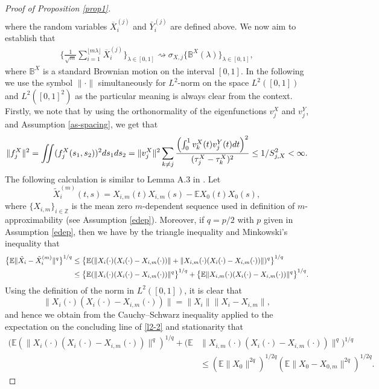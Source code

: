 \documentclass[11pt]{article}
\numberwithin{equation}{section}
\numberwithin{theorem}{section}
\numberwithin{lemma}{section}
\numberwithin{proposition}{section}
\numberwithin{cor}{section}
\numberwithin{definition}{section}
\numberwithin{cons}{section}
\numberwithin{rem}{section}
\numberwithin{exa}{section}
\numberwithin{table}{section}
\numberwithin{figure}{section}
\numberwithin{algo}{section}
\newcommand{\intt}{\int\hspace{-.2cm}\int}
\begin{document}
{{\begin{proof}[Proof of Proposition \ref{prop1}]
\begin{eqnarray}
\end{eqnarray}
where the random variables $\overline{X}_i^{(j)}$ and $\bar{Y}_i^{(j)}$ are defined above. We now aim to establish that
\begin{align}\label{x-conv}
\Big \{
\frac {1}{\sqrt{m}} \sum_{i=1}^{\lfloor m \lambda \rfloor} \overline{X}_i^{(j)}  \Big\}_{\lambda \in [0,1]}
\rightsquigarrow \sigma_{X,j}  \{ \mathbb{B}^X(\lambda) \}_{\lambda \in [0,1]},
\end{align}
where $\mathbb{B}^X$ is a standard Brownian motion on the interval $[0,1]$. In the following we use the symbol $\| \cdot \|$ simultaneously for $L^2$-norm on the space $L^2 ([0,1])$ and $L^2([0,1]^2)$ as the particular meaning is always clear from the context.
Firstly, we note that by using the orthonormality of the eigenfunctions $v_j^X$ and $v_j^Y$, and Assumption \ref{as-spacing}, we get that
$$
\|f^X_j\|^2=\intt (f^X_j (s_1,s_2))^2 ds_1ds_2  = \|v_j^X\|^2 \sum_{k\ne j} \frac { \left(\int^1_0 v^X_k (t) v^Y_j (t) dt \right)^2}{(\tau^X_j - \tau^X_k)^2}  \le 1/S_{j,X}^2 < \infty.
$$
The following calculation is similar to Lemma A.3 in \cite{aue:rice:sonmez:eigen:2018}. Let
$$
\tilde X_i^{(m)}(t,s) = X_{i,m}(t)X_{i,m}(s) - \mathbb{E}X_0(t)X_0(s),
$$
where
$\{ X_{i,m} \}_{i  \in \mathbb{Z}}$ is the  mean zero  $m$-dependent sequence used  in definition of  $m$-approximability (see Assumption \ref{edep}).
 Moreover, if $q=p/2$ with $p$ given in Assumption \ref{edep}, then we have by the triangle inequality and Minkowski's inequality that
\begin{align}\label{l2-2}
\big \{ \mathbb{E}\|\tilde X_i - \tilde X_i^{(m)}  \|^q\big \}^{1/q} &\le \big \{ \mathbb{E}( \|X_i(\cdot)(X_i(\cdot)-X_{i,m}(\cdot))\| + \|X_{i,m}(\cdot)(X_i(\cdot)-X_{i,m}(\cdot))\| )^q \big \}^{1/q} \\
&\le  \big \{ \mathbb{E}( \|X_i(\cdot)(X_i(\cdot)-X_{i,m}(\cdot))\|^q \big \}^{1/q} + \big \{\mathbb{E}\|X_{i,m}(\cdot)(X_i(\cdot)-X_{i,m}(\cdot))\|^q \big \}^{1/q}. \notag
\end{align}
Using the definition of the norm in $L^2([0,1])$, it is clear that
$$
\|X_i(\cdot)(X_i(\cdot)-X_{i,m}(\cdot))\|= \|X_i\|\|X_i-X_{i,m}\|,
$$
 and hence we obtain from the Cauchy--Schwarz inequality applied to the expectation on the concluding line of \eqref{l2-2} and stationarity that
\begin{align*}
( \mathbb{E}( \|X_i(\cdot)(X_i(\cdot)-X_{i,m}(\cdot))\|^q)^{1/q} + (\mathbb{E} & \|X_{i,m}(\cdot)(X_i(\cdot)-X_{i,m}(\cdot))\|^q)^{1/q} \\
&\le (\mathbb{E}\|X_0\|^{2q})^{1/2q}(\mathbb{E}\|X_0-X_{0,m}\|^{2q})^{1/2q}.

\end{align*}
\end{proof}}}
\end{document}
